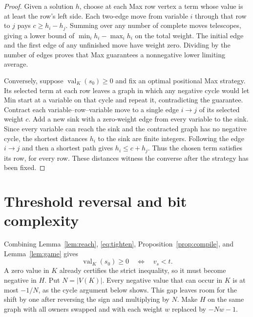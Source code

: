 \documentclass[11pt,letterpaper]{article}
\newcommand{\val}{\operatorname{val}}
\begin{document}
\begin{proof}
Given a solution \(h\), choose at each Max row vertex a term whose value is at
least the row's left side. Each two-edge move from variable \(i\) through that row
to \(j\) pays \(c\ge h_i-h_j\). Summing over any number of complete moves
telescopes, giving a lower bound of \(\min_i h_i-\max_i h_i\) on the total weight.
The initial edge and the first edge of any unfinished move have weight zero.
Dividing by the number of edges proves that Max guarantees a nonnegative lower
limiting average.

Conversely, suppose \(\val_K(s_0)\ge0\) and fix an optimal positional Max strategy.
Its selected term at each row leaves a graph in which any negative cycle would
let Min start at a variable on that cycle and repeat it, contradicting the guarantee.
Contract each variable--row--variable move to a single edge \(i\to j\) of its selected weight
\(c\). Add a new sink with a zero-weight edge from every variable to the sink.
Since every variable can reach the sink and the contracted graph has no negative
cycle, the shortest distances \(h_i\) to the sink are finite integers. Following
the edge \(i\to j\) and then a shortest path gives \(h_i\le c+h_j\). Thus the
chosen term satisfies its row, for every row. These distances witness the converse
after the strategy has been fixed.
\end{proof}

\section{Threshold reversal and bit complexity}

Combining Lemma~\ref{lem:reach}, \eqref{eq:tighten}, Proposition~\ref{prop:compile},
and Lemma~\ref{lem:game} gives
\[
                 \val_K(s_0)\ge 0 \quad\Longleftrightarrow\quad v_s<t .
\]
A zero value in \(K\) already certifies the strict inequality, so it must
become negative in \(H\). Put \(N=|V(K)|\). Every negative value that can
occur in \(K\) is at most \(-1/N\), as the cycle argument below shows.
This gap leaves room for the shift by one after reversing the sign and
multiplying by \(N\). Make \(H\) on the same graph with all owners swapped
and with each weight \(w\) replaced by \(-Nw-1\).
\end{document}
